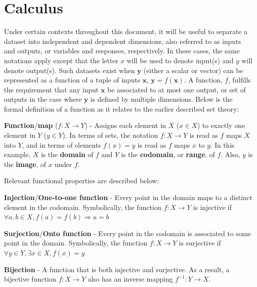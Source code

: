 \section{Calculus}

Under certain contexts throughout this document, it will be useful to separate a dataset into independent and dependent dimensions, also referred to as inputs and outputs, or variables and responses, respectively.
%
In these cases, the same notations apply except that the letter $x$ will be used to denote input(s) and $y$ will denote output(s).
%
Such datasets exist when $\mathbf{y}$ (either a scalar or vector) can be represented as a function of a tuple of inputs $\mathbf{x}$, $\mathbf{y}=f(\mathbf{x})$.
%
A function, $f$, fulfills the requirement that any input $\mathbf{x}$ be associated to at most one output, or set of outputs in the case where $\mathbf{y}$ is defined by multiple dimensions.
%
Below is the formal definition of a function as it relates to the earlier described set theory:

\begin{defn}
  \textbf{Function}/\textbf{map} ($f : X \rightarrow Y$) - Assigns each
  element in $X$ ($x \in X$) to exactly one element in $Y$ ($y \in Y$).
  In terms of sets, the notation $f : X \rightarrow Y$ is read as $f$
  maps $X$ into $Y$, and in terms of elements $f(x)=y$ is read as $f$ maps $x$
  to $y$.
  In this example, $X$ is the \textbf{domain} of $f$ and $Y$ is the
  \textbf{codomain}, or \textbf{range}, of $f$. Also, $y$ is the \textbf{image},
  of $x$ under $f$.
\end{defn}

Relevant functional properties are described below:

\begin{defn}
  \textbf{Injection}/\textbf{One-to-one function} - Every point in the domain
  maps to a distinct element in the codomain. Symbolically, the function
  $f:X\rightarrow Y$ is injective if $\forall a,b\in X,f(a)=f(b)\Rightarrow a=b$
\end{defn}

\begin{defn}
  \textbf{Surjection}/\textbf{Onto function} - Every point in the codomain is
  associated to some point in the domain. Symbolically, the function
  $f:X \rightarrow Y$ is surjective if $\forall y \in Y,\exists x \in X,f(x)=y$
\end{defn}

\begin{defn}
  \textbf{Bijection} - A function that is both injective and surjective. As a
  result, a bijective function $f: X \rightarrow Y$ also has an inverse mapping
  $f^{-1} : Y \rightarrow X$.
\end{defn}

